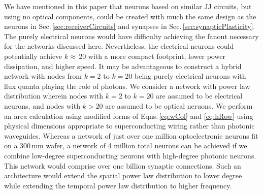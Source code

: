 \documentclass[twocolumn]{article}
\begin{document}
We have mentioned in this paper that neurons based on similar JJ circuits, but using no optical components, could be created with much the same design as the neurons in Sec.\,\ref{sec:receiverCircuits} and synapses in Sec.\,\ref{sec:synapticPlasticity}. The purely electrical neurons would have difficulty achieving the fanout necessary for the networks discussed here. Nevertheless, the electrical neurons could potentially achieve $k\approx$\,20 with a more compact footprint, lower power dissipation, and higher speed. It may be advantageous to construct a hybrid network with nodes from $k = 2$ to $k = 20$ being purely electrical neurons with flux quanta playing the role of photons. We consider a network with power law distribution wherein nodes with $k = 2$ to $k = 20$ are assumed to be electrical neurons, and nodes with $k > 20$ are assumed to be optical neruons. We perform an area calculation using modified forms of Eqns.\,\ref{eq:wCol} and \ref{eq:hRow} using physical dimensions appropriate to superconducting wiring rather than photonic waveguides. Whereas a network of just over one million optoelectronic neurons fit on a 300\,mm wafer, a network of 4 million total neurons can be achieved if we combine low-degree superconducting neurons with high-degree photonic neurons. This network would comprise over one billion synaptic connections. Such an architecture would extend the spatial power law distribution to lower degree while extending the temporal power law distribution to higher frequency. 
\end{document}
